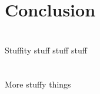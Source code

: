 \documentclass[10pt, final, journal, letterpaper, twoside, twocolumn]{IEEEtran}
\begin{document}

\section{Conclusion}

\pagebreak
	
\appendices
	\section{}
		Stuffity stuff stuff stuff
	\section{}
		More stuffy things
	
\newpage
\nocite{*}


\end{document}
